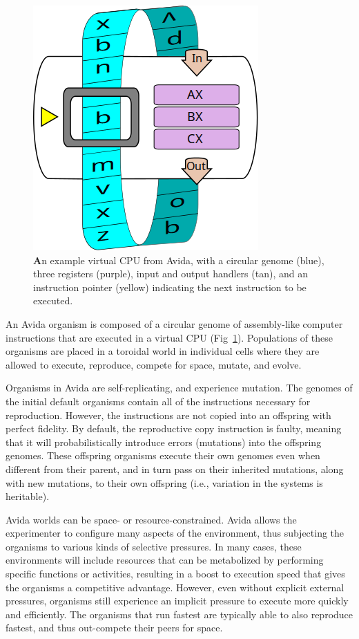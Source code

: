 \documentclass[PhD]{msu-thesis}
\begin{document}
\begin{figure}[!h]
\includegraphics[width=0.5\columnwidth]{figures/methods/squishedCPU_extra.png}
\caption{{\textbf An example virtual CPU from Avida}, with a circular genome (blue), three registers (purple), input and output handlers (tan), and an instruction pointer (yellow) indicating the next instruction to be executed.%
}\label{fig:cpu}
\end{figure}

An Avida organism is composed of a circular genome of assembly-like computer instructions that are executed in a virtual CPU (Fig~\ref{fig:cpu}). Populations of these organisms are placed in a toroidal world in individual cells where they are allowed to execute, reproduce, compete for space, mutate, and evolve.

Organisms in Avida are self-replicating, and experience mutation. The genomes of the initial default organisms contain all of the instructions necessary for reproduction. However, the instructions are not copied into an offspring with perfect fidelity. By default, the reproductive copy instruction is faulty, meaning that it will probabilistically introduce errors (mutations) into the offspring genomes. These offspring organisms execute their own genomes even when different from their parent, and in turn pass on their inherited mutations, along with new mutations, to their own offspring (i.e., variation in the systems is heritable).

Avida worlds can be space- or resource-constrained. Avida allows the experimenter to configure many aspects of the environment, thus subjecting the organisms to various kinds of selective pressures.  In many cases, these environments will include resources that can be metabolized by performing specific functions or activities, resulting in a boost to execution speed that gives the organisms a competitive advantage. However, even without explicit external pressures, organisms still experience an implicit pressure to execute more quickly and efficiently. The organisms that run fastest are typically able to also reproduce fastest, and thus out-compete their peers for space.
\end{document}
